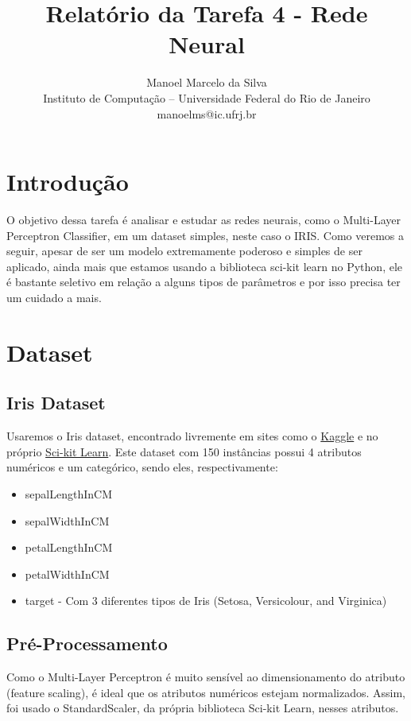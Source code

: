 \documentclass{article}
\title{Relatório da Tarefa 4 - Rede Neural}
\author{Manoel Marcelo da Silva\\
Instituto de Computação -- Universidade Federal do Rio de Janeiro\\
manoelms@ic.ufrj.br
}
\begin{document}
\maketitle

\section{Introdução}

O objetivo dessa tarefa é analisar e estudar as redes neurais, como o Multi-Layer Perceptron Classifier, em um dataset simples, neste caso o IRIS. Como veremos a seguir, apesar de ser um modelo extremamente poderoso e simples de ser aplicado, ainda mais que estamos usando a biblioteca sci-kit learn no Python, ele é bastante seletivo em relação a alguns tipos de parâmetros e por isso precisa ter um cuidado a mais.

\section{Dataset}

\subsection{Iris Dataset}

Usaremos o Iris dataset, encontrado livremente em sites como o \href{https://www.kaggle.com/datasets/uciml/iris}{Kaggle} e no próprio \href{https://scikit-learn.org/stable/auto_examples/datasets/plot_iris_dataset.html}{Sci-kit Learn}. Este dataset com 150 instâncias possui 4 atributos numéricos e um categórico, sendo eles, respectivamente: 

\begin{itemize}
    \item sepalLengthInCM 
    \item sepalWidthInCM	 
    \item petalLengthInCM	
    \item petalWidthInCM	
    \item target - Com 3 diferentes tipos de Iris (Setosa, Versicolour, and Virginica)
\end{itemize}

\subsection{Pré-Processamento}
Como o Multi-Layer Perceptron é muito sensível ao dimensionamento do atributo (feature scaling), é ideal que os atributos numéricos estejam normalizados. Assim, foi usado o StandardScaler, da própria biblioteca Sci-kit Learn, nesses atributos.
\end{document}
